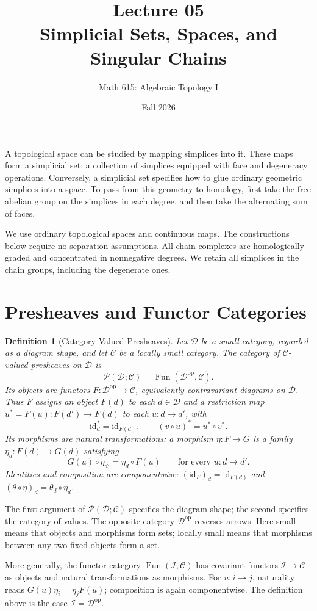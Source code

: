 \documentclass[11pt]{article}
\title{\color{teal}\bfseries Lecture 05\\Simplicial Sets, Spaces, and Singular Chains}
\author{Math 615: Algebraic Topology I}
\date{Fall 2026}
\theoremstyle{linked}
\theoremstyle{plainlecture}
\newtheorem{definition}[proposition]{Definition}
\newcommand{\PSh}{\mathcal{P}}
\newcommand{\Fun}{\operatorname{Fun}}
\newcommand{\id}{\mathrm{id}}
\begin{document}
\maketitle
\noindent
A topological space can be studied by mapping simplices into it. These maps form a simplicial set: a collection of simplices equipped with face and degeneracy operations. Conversely, a simplicial set specifies how to glue ordinary geometric simplices into a space. To pass from this geometry to homology, first take the free abelian group on the simplices in each degree, and then take the alternating sum of faces.

We use ordinary topological spaces and continuous maps. The constructions below require no separation assumptions. All chain complexes are homologically graded and concentrated in nonnegative degrees. We retain all simplices in the chain groups, including the degenerate ones.

\setcounter{tocdepth}{2}
\tableofcontents
\clearpage
\section{Presheaves and Functor Categories}
\begin{definition}[Category-Valued Presheaves]
Let $\mathcal D$ be a small category, regarded as a diagram shape, and let $\mathcal C$ be a locally small category. The category of $\mathcal C$-valued presheaves on $\mathcal D$ is
\[
\PSh(\mathcal D;\mathcal C)=\Fun(\mathcal D^{\mathrm{op}},\mathcal C).
\]
Its objects are functors $F:\mathcal D^{\mathrm{op}}\to\mathcal C$, equivalently contravariant diagrams on $\mathcal D$. Thus $F$ assigns an object $F(d)$ to each $d\in\mathcal D$ and a restriction map $u^*=F(u):F(d')\to F(d)$ to each $u:d\to d'$, with
\[
\id_d^*=\id_{F(d)},\qquad (v\circ u)^*=u^*\circ v^*.
\]
Its morphisms are natural transformations: a morphism $\eta:F\to G$ is a family $\eta_d:F(d)\to G(d)$ satisfying
\[
G(u)\circ\eta_{d'}=\eta_d\circ F(u)
\qquad\text{for every }u:d\to d'.
\]
Identities and composition are componentwise:
$(\id_F)_d=\id_{F(d)}$ and $(\theta\circ\eta)_d=\theta_d\circ\eta_d$.
\end{definition}
The first argument of $\PSh(\mathcal D;\mathcal C)$ specifies the diagram shape; the second specifies the category of values. The opposite category $\mathcal D^{\mathrm{op}}$ reverses arrows. Here small means that objects and morphisms form sets; locally small means that morphisms between any two fixed objects form a set.

More generally, the functor category $\Fun(\mathcal I,\mathcal C)$ has covariant functors $\mathcal I\to\mathcal C$ as objects and natural transformations as morphisms. For $u:i\to j$, naturality reads $G(u)\eta_i=\eta_jF(u)$; composition is again componentwise. The definition above is the case $\mathcal I=\mathcal D^{\mathrm{op}}$.
\end{document}
